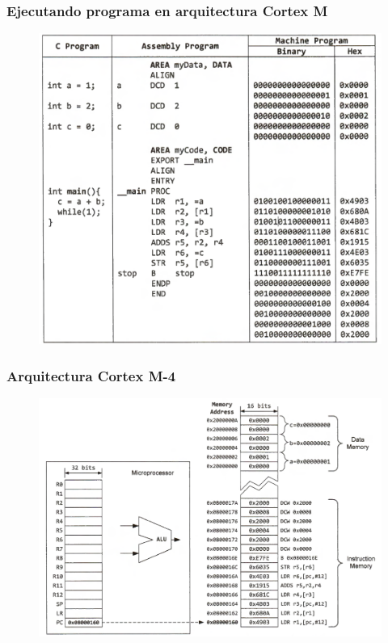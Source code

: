 \documentclass[10.5pt,scale=1.0,t,aspectratio=169,hyperref={pdfpagelabels=false}]{beamer}
\begin{document}
\begin{frame}
	\frametitle{Ejecutando programa en arquitectura Cortex M}
	\begin{figure}
		\centering
		\includegraphics[scale=0.4]{EjecutandoPrograma}
	\end{figure}
\end{frame}

\begin{frame}
	\frametitle{Arquitectura Cortex M-4}
	\begin{figure}
		\centering
		\includegraphics[scale=0.45]{ArquitecturaARM}
	\end{figure}
\end{frame}
\end{document}
